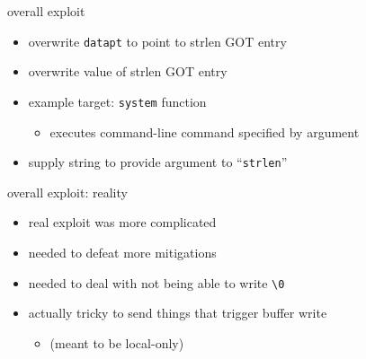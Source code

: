 
\begin{frame}{overall exploit}
    \begin{itemize}
    \item overwrite {\tt datapt} to point to strlen GOT entry
    \item overwrite value of strlen GOT entry
    \item example target: {\tt system} function
            \begin{itemize}
                \item executes command-line command specified by argument
            \end{itemize}
    \item supply string to provide argument to ``{\tt strlen}''
    \end{itemize}
\end{frame}


\begin{frame}{overall exploit: reality}
    \begin{itemize}
    \item real exploit was more complicated
    \item needed to defeat more mitigations
    \item needed to deal with not being able to write {\tt \textbackslash 0}
    \item actually tricky to send things that trigger buffer write
        \begin{itemize}
        \item (meant to be local-only)
        \end{itemize}
    \end{itemize}
\end{frame}

